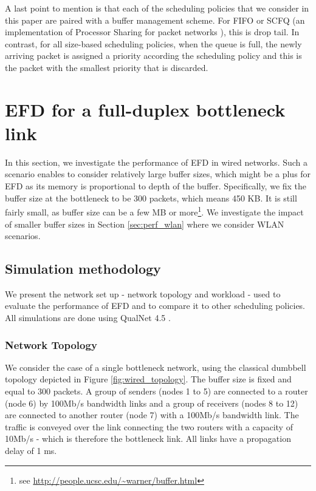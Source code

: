 \documentclass[preprint,12pt]{elsarticle}
\begin{document}
A last point to mention is that each of the scheduling policies that we consider in this paper are paired with a buffer management scheme. For FIFO or SCFQ (an implementation of Processor Sharing for packet networks \cite{Golestani94}), this is drop tail. In contrast, for all size-based scheduling policies, when the queue is full, the newly arriving packet is assigned a priority according the scheduling policy and this is the packet with the smallest priority that is discarded.


\section{EFD for a full-duplex bottleneck link}
\label{sec:perf_wired}
In this section, we investigate the performance of EFD in wired networks. Such a scenario enables to consider relatively large buffer sizes, which might be a plus for EFD as its memory is proportional to depth of the buffer. Specifically, we fix the buffer size at the bottleneck to be 300 packets, which means 450 KB. It is still fairly small, as buffer size can be a few MB or more\footnote{see \url{http://people.ucsc.edu/~warner/buffer.html}}. We investigate the impact of smaller buffer sizes in Section \ref{sec:perf_wlan} where we consider WLAN scenarios.%

\subsection{Simulation methodology} \label{sec:wired_methodology}
We present the network set up - network topology and workload - used to evaluate the performance of EFD and to compare it to other scheduling policies. All simulations are done using QualNet 4.5 \cite{Qualnet}.

\subsubsection{Network Topology}
We consider the case of a single bottleneck network, using the classical dumbbell topology depicted in Figure \ref{fig:wired_topology}. The buffer size is  fixed and equal to 300 packets. A group of senders (nodes 1 to 5) are connected to a router (node 6) by 100Mb/s bandwidth links and a group of receivers (nodes 8 to 12) are connected to another router (node 7) with a 100Mb/s bandwidth link. The traffic is conveyed over the link connecting the two routers with a capacity of 10Mb/s - which is therefore the bottleneck link. All links have a propagation delay of 1 ms.
\end{document}
